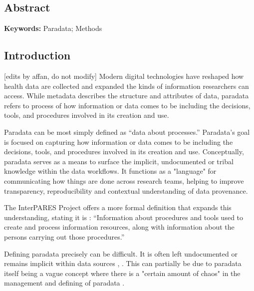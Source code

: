 \subsection{Abstract}

\textbf{Keywords:}
Paradata;
Methods

\subsection{Introduction}  %
[edits by affan, do not modify] Modern digital technologies have reshaped how health data are collected and expanded the kinds of information researchers can access. While metadata describes the structure and attributes of data, paradata refers to process of how information or data comes to be including the decisions, tools, and procedures involved in its creation and use. 

% 
% 
% 

Paradata can be most simply defined as ``data about processes.'' \cite{huvila_perspectives_2024}
Paradata's goal is focused on capturing how information or data comes to be including the decisions, tools, and procedures involved in its creation and use. Conceptually, paradata serves as a means to surface the implicit, undocumented or tribal knowledge within the data workflows. It functions as a "language" for communicating how things are done across research teams, helping to improve transparency, reproducibility and contextual understanding of data provenance.

The InterPARES Project offers a more formal definition that expands this understanding, stating it is \cite{davet_tracking_2022}: ``Information about procedures and tools used to create and process information resources, along with information about the persons carrying out those procedures.''

Defining paradata precisely can be difficult.
It is often left undocumented or remains implicit within data sources \cite{borjesson_re-purposing_2022}, \cite{huvila_documenting_2021}. 
This can partially be due to paradata itself being a vague concept where there is a "certain amount of chaos" in the management and defining of paradata \cite{cohen_paradata_2024}.


